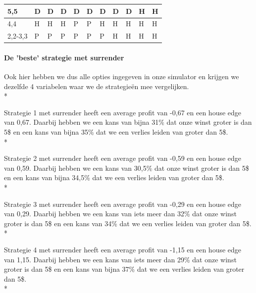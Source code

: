 \documentclass[conference]{IEEEtran}
\begin{document}
\begin{table}[ht]
\begin{tabular}{|l|l|l|l|l|l|l|l|l|l|l|}
5,5                          & \cellcolor{blue!25}D & \cellcolor{blue!25}D & \cellcolor{blue!25}D & \cellcolor{blue!25}D & \cellcolor{blue!25}D & \cellcolor{blue!25}D & \cellcolor{blue!25}D & \cellcolor{blue!25}D & \cellcolor{green!50}H & \cellcolor{green!50}H  \\ \hline
4,4                          & \cellcolor{green!50}H & \cellcolor{green!50}H & \cellcolor{green!50}H & \cellcolor{yellow!75}P & \cellcolor{yellow!75}P & \cellcolor{green!50}H & \cellcolor{green!50}H & \cellcolor{green!50}H & \cellcolor{green!50}H & \cellcolor{green!50}H  \\ \hline
2,2-3,3                      & \cellcolor{yellow!75}P & \cellcolor{yellow!75}P & \cellcolor{yellow!75}P & \cellcolor{yellow!75}P & \cellcolor{yellow!75}P & \cellcolor{yellow!75}P & \cellcolor{green!50}H & \cellcolor{green!50}H & \cellcolor{green!50}H & \cellcolor{green!50}H  \\ \hline

\end{tabular}
\end{table}


\paragraph{De 'beste' strategie met surrender}

Ook hier hebben we dus alle opties ingegeven in onze simulator en krijgen we dezelfde 4 variabelen waar we de strategie\"en mee vergelijken. \\*
 
Strategie 1 met surrender heeft een average profit van -0,67 en een house edge van 0,67. Daarbij hebben we een kans van bijna 31\% dat onze winst groter is dan 5\$ en een kans van bijna 35\% dat we een verlies leiden van groter dan 5\$. \\*
 
Strategie 2 met surrender heeft een average profit van -0,59 en een house edge van 0,59. Daarbij hebben we een kans van 30,5\% dat onze winst groter is dan 5\$ en een kans van bijna 34,5\% dat we een verlies leiden van groter dan 5\$. \\*
 
Strategie 3 met surrender heeft een average profit van -0,29 en een house edge van 0,29. Daarbij hebben we een kans van iets meer dan 32\% dat onze winst groter is dan 5\$ en een kans van 34\% dat we een verlies leiden van groter dan 5\$. \\*
 
Strategie 4 met surrender heeft een average profit van -1,15 en een house edge van 1,15. Daarbij hebben we een kans van iets meer dan 29\% dat onze winst groter is dan 5\$ en een kans van bijna 37\% dat we een verlies leiden van groter dan 5\$. \\*
 
\end{document}
